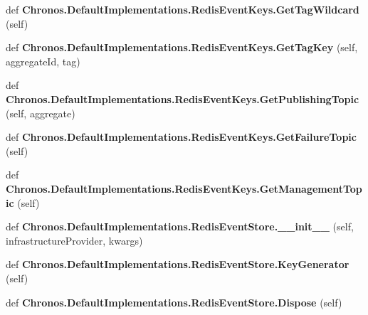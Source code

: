 \begin{DoxyCompactItemize}
\item 
def {\bfseries Chronos.\+Default\+Implementations.\+Redis\+Event\+Keys.\+Get\+Tag\+Wildcard} (self)\hypertarget{group__Chronos_ga119d199a331f3af2e122384868d9b8b5}{}\label{group__Chronos_ga119d199a331f3af2e122384868d9b8b5}

\item 
def {\bfseries Chronos.\+Default\+Implementations.\+Redis\+Event\+Keys.\+Get\+Tag\+Key} (self, aggregate\+Id, tag)\hypertarget{group__Chronos_ga9199dd53b643911b01e76df102f72f86}{}\label{group__Chronos_ga9199dd53b643911b01e76df102f72f86}

\item 
def {\bfseries Chronos.\+Default\+Implementations.\+Redis\+Event\+Keys.\+Get\+Publishing\+Topic} (self, aggregate)\hypertarget{group__Chronos_ga4e6b972382dcbd5f4e0378adb5b81377}{}\label{group__Chronos_ga4e6b972382dcbd5f4e0378adb5b81377}

\item 
def {\bfseries Chronos.\+Default\+Implementations.\+Redis\+Event\+Keys.\+Get\+Failure\+Topic} (self)\hypertarget{group__Chronos_ga958d40c9ba3a5c2b3cf39774448cce49}{}\label{group__Chronos_ga958d40c9ba3a5c2b3cf39774448cce49}

\item 
def {\bfseries Chronos.\+Default\+Implementations.\+Redis\+Event\+Keys.\+Get\+Management\+Topic} (self)\hypertarget{group__Chronos_gafd44176cad0063dfe7350ff0cfb0a3a2}{}\label{group__Chronos_gafd44176cad0063dfe7350ff0cfb0a3a2}

\item 
def {\bfseries Chronos.\+Default\+Implementations.\+Redis\+Event\+Store.\+\_\+\+\_\+init\+\_\+\+\_\+} (self, infrastructure\+Provider, kwargs)\hypertarget{group__Chronos_gad047bd82eb83d7446cbaee67e86aec98}{}\label{group__Chronos_gad047bd82eb83d7446cbaee67e86aec98}

\item 
def {\bfseries Chronos.\+Default\+Implementations.\+Redis\+Event\+Store.\+Key\+Generator} (self)\hypertarget{group__Chronos_gaee2c5812ef33040c38fecaa90d05df56}{}\label{group__Chronos_gaee2c5812ef33040c38fecaa90d05df56}

\item 
def {\bfseries Chronos.\+Default\+Implementations.\+Redis\+Event\+Store.\+Dispose} (self)\hypertarget{group__Chronos_gaafc557a2cab7b3f59c99bdaf826e4c01}{}\label{group__Chronos_gaafc557a2cab7b3f59c99bdaf826e4c01}


\end{DoxyCompactItemize}
